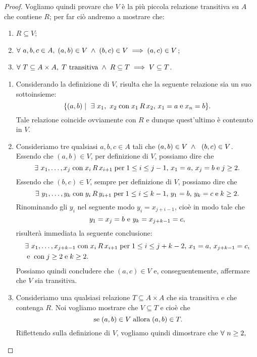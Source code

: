 \begin{proof}

Vogliamo quindi provare che $V$ è la più piccola relazione transitiva su $A$ che contiene $R$; per far ciò andremo a mostrare che:
\begin{enumerate}
\item $R \subseteq V$;
\item $\forall \ a,b,c \in A ,\;
	(a,b) \in V \; \land \; (b,c) \in V
	\implies (a,c) \in V$;
\item $\forall \ T \subseteq A \times A ,\;
	T \ \text{transitiva} \; \land \; R \subseteq T
	\implies V \subseteq T$.
\end{enumerate}

\begin{enumerate}[leftmargin=*]
\item Considerando la definizione di $V$, risulta che la seguente relazione sia un suo sottoinsieme: \[
	\{(a, b) \mid 
	\ \exists \ x_1, \ x_2 \; \text{con} \; x_1 \, R \, x_2 \text{,} 
	\ x_1 = a \; \text{e} \; x_n = b
	\}.
\]
Tale relazione coincide ovviamente con $R$ e dunque quest'ultimo è contenuto in $V$.
\item Consideriamo tre qualsiasi $a,b,c \in A$ tali che $(a,b) \in V \; \land \; \ (b,c) \in V$.
Essendo che $(a,b) \in V$, per definizione di $V$, possiamo dire che \[
	\exists \ x_1, \ldots, x_j 
	\; \text{con} \; x_i \, R \, x_{i+1} \; \text{per} \; 1 \leq i \leq j-1 \text{,} 
	\ x_1 = a \text{,} \ x_j = b \; \text{e} \; j \geq 2.
\]
Essendo che $(b,c) \in V$, sempre per definizione di $V$, possiamo dire che \[
	\exists \ y_1, \ldots, y_k
	\; \text{con} \; y_i \, R \, y_{i+1} \; \text{per} \; 1 \leq i \leq k-1 \text{,} 
	\ y_1 = b \text{,} \ y_k = c \; \text{e} \; k \geq 2.
\]
Rinominando gli $y_i$ nel seguente modo $y_i = x_{j+i-1}$, cioè in modo tale che \[
	y_1 = x_j = b$ e $y_k = x_{j+k-1} = c \text{,}
\]
risulterà immediata la seguente conclusione:
\begin{align*}
	& \exists \ x_1, \ldots, x_{j+k-1}
	\; \text{con} \; x_i \, R \, x_{i+1} \; \text{per} \; 1 \leq i \leq j+k-2 \text{,}
	\ x_1 = a \text{,} \ x_{j+k-1} = c \text{,}\\
	& \; \text{e} \; \; \text{con} \; j \geq 2 \; \text{e} \; k \geq 2.
\end{align*}
Possiamo quindi concludere che $(a,c) \in V$ e, conseguentemente, affermare che $V$ sia transitiva.
\item Consideriamo una qualsiasi relazione $T \subseteq A \times A$ che sia transitiva e che contenga $R$. Noi vogliamo mostrare che $V \subseteq T$ e cioè che \[
	\; \text{se} \; (a,b) \in V \; \text{allora} \; (a,b) \in T.
\]
Riflettendo sulla definizione di $V$, vogliamo quindi dimostrare che $\forall \ n \geq 2 ,\;$

\end{enumerate}
\end{proof}
